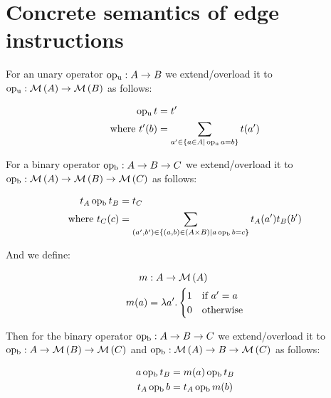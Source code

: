 \section{Concrete semantics of edge instructions}\label{sec:concrete-semantics}
For an unary operator $\operatorname{op_u} : A \rightarrow B$ we extend/overload it to $\operatorname{op_u} : \mathcal{M}\left(A\right) \rightarrow \mathcal{M}\left(B\right)$ as follows:

\begin{align}
    \operatorname{op_u} t &= t' \\
    \text{where } t'(b) &= \sum_{a' \in \{a \in A | \operatorname{op_u} a = b\}} t(a')
\end{align}

For a binary operator $\operatorname{op_b} : A \rightarrow B \rightarrow C$ we extend/overload it to $\operatorname{op_b} : \mathcal{M}\left(A\right) \rightarrow \mathcal{M}\left(B\right) \rightarrow \mathcal{M}\left(C\right)$ as follows:

\begin{align}
    t_A \operatorname{op_b} t_B &= t_C \\
    \text{where } t_C(c) &= \sum_{(a', b') \in \{(a,b) \in (A \times B) | a \operatorname{op_b} b = c\}} t_A(a') t_B(b')
\end{align}

And we define:

\begin{align}
    m &: A \rightarrow \mathcal{M}\left(A\right) \\
    m(a) &= \lambda a'. \begin{cases}
        1 & \text{if } a' = a\\
        0 & \text{otherwise}
    \end{cases}
\end{align}

Then for the binary operator $\operatorname{op_b} : A \rightarrow B \rightarrow C$ we extend/overload it to $\operatorname{op_b} : A \rightarrow \mathcal{M}\left(B\right) \rightarrow \mathcal{M}\left(C\right)$ and $\operatorname{op_b} : \mathcal{M}\left(A\right) \rightarrow B \rightarrow \mathcal{M}\left(C\right)$ as follows:

\begin{align}
    a \operatorname{op_b} t_B &= m(a) \operatorname{op_b} t_B \\
    t_A \operatorname{op_b} b &= t_A \operatorname{op_b} m(b)
\end{align}


